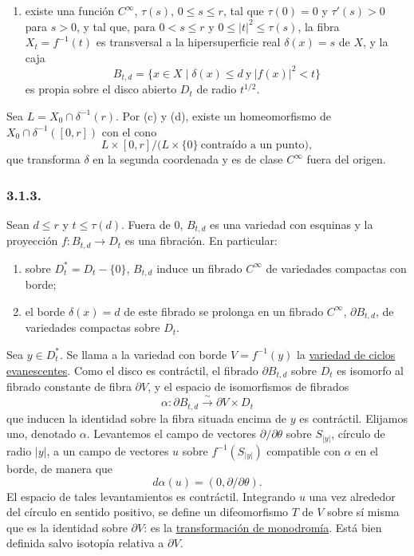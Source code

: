 \begin{enumerate}[label=(\alph*),start=5]
\item existe una función $C^\infty$, $\tau(s)$, $0\leq s\leq r$,
  tal que $\tau(0)=0$ y $\tau'(s)>0$ para $s>0$, y tal que, para
  $0<s\leq r$ y $0\leq |t|^2\leq\tau(s)$, la fibra
  $X_t=f^{-1}(t)$ es transversal a la hipersuperficie real
  $\delta(x)=s$ de $X$, y la caja
  \[
  B_{t,d}=\{x\in X\mid \delta(x)\leq d\ \text{y}\ |f(x)|^2<t\}
  \]
  es propia sobre el disco abierto $D_t$ de radio $t^{1/2}$.
\end{enumerate}

\pageoriginale

Sea $L=X_0\cap\delta^{-1}(r)$. Por (c) y (d), existe un homeomorfismo
de $X_0\cap\delta^{-1}([0,r])$ con el cono
\[
L\times[0,r]\big/\bigl(L\times\{0\}\ \text{contraído a un punto}\bigr),
\]
que transforma $\delta$ en la segunda coordenada y es de clase
$C^\infty$ fuera del origen.

\subsubsection*{3.1.3.}
Sean $d\leq r$ y $t\leq\tau(d)$. Fuera de $0$, $B_{t,d}$ es una
variedad con esquinas y la proyección $f:B_{t,d}\to D_t$ es una
fibración. En particular:

\begin{enumerate}[label=(\alph*)]
\item sobre $D_t^*=D_t-\{0\}$, $B_{t,d}$ induce un fibrado
  $C^\infty$ de variedades compactas con borde;
\item el borde $\delta(x)=d$ de este fibrado se prolonga en un
  fibrado $C^\infty$, $\partial B_{t,d}$, de variedades compactas
  sobre $D_t$.
\end{enumerate}

Sea $y\in D_t^*$. Se llama a la variedad con borde
$V=f^{-1}(y)$ la \underline{variedad de ciclos evanescentes}. Como el
disco es contráctil, el fibrado $\partial B_{t,d}$ sobre $D_t$ es
isomorfo al fibrado constante de fibra $\partial V$, y el espacio de
isomorfismos de fibrados
\[
\alpha:\partial B_{t,d}\xrightarrow{\ \sim\ }\partial V\times D_t
\]
que inducen la identidad sobre la fibra situada encima de $y$ es
contráctil. Elijamos uno, denotado $\alpha$. Levantemos el campo de
vectores $\partial/\partial\theta$ sobre $S_{|y|}$, círculo de radio
$|y|$, a un campo de vectores $u$ sobre $f^{-1}(S_{|y|})$ compatible
con $\alpha$ en el borde, de manera que
\[
d\alpha(u)=(0,\partial/\partial\theta).
\]
El espacio de tales levantamientos es contráctil. Integrando $u$ una
vez alrededor del círculo en sentido positivo, se define un
difeomorfismo $T$ de $V$ sobre sí misma que es la identidad sobre
$\partial V$: es la \underline{transformación de monodromía}. Está
bien definida salvo isotopía relativa a $\partial V$.

